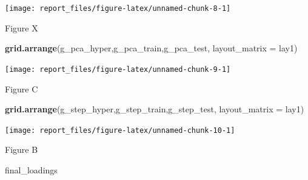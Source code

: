 \documentclass[
  11pt,
]{article}
\newenvironment{Shaded}{\begin{snugshade}}{\end{snugshade}}
\newcommand{\DataTypeTok}[1]{\textcolor[rgb]{0.13,0.29,0.53}{#1}}
\newcommand{\KeywordTok}[1]{\textcolor[rgb]{0.13,0.29,0.53}{\textbf{#1}}}
\newcommand{\NormalTok}[1]{#1}
\begin{document}
\begin{center}\texttt{[image: report\_files/figure-latex/unnamed-chunk-8-1]} \end{center}

Figure X

\begin{Shaded}
\begin{Highlighting}[]
\KeywordTok{grid.arrange}\NormalTok{(g_pca_hyper,g_pca_train,g_pca_test, }\DataTypeTok{layout_matrix =}\NormalTok{ lay1)}
\end{Highlighting}
\end{Shaded}

\begin{center}\texttt{[image: report\_files/figure-latex/unnamed-chunk-9-1]} \end{center}

Figure C

\begin{Shaded}
\begin{Highlighting}[]
\KeywordTok{grid.arrange}\NormalTok{(g_step_hyper,g_step_train,g_step_test, }\DataTypeTok{layout_matrix =}\NormalTok{ lay1)}
\end{Highlighting}
\end{Shaded}

\begin{center}\texttt{[image: report\_files/figure-latex/unnamed-chunk-10-1]} \end{center}

Figure B

\begin{Shaded}
\begin{Highlighting}[]
\NormalTok{final_loadings}
\end{Highlighting}
\end{Shaded}
\end{document}
